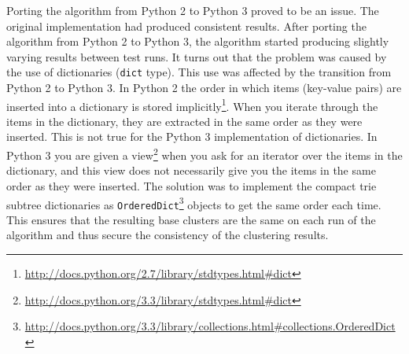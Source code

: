 

Porting the \CTC algorithm from Python 2 to Python 3 proved to be an issue. The original \CTC implementation had produced consistent results. After porting the algorithm from Python 2 to Python 3, the algorithm started producing slightly varying results between test runs. It turns out that the problem was caused by the use of dictionaries (\texttt{dict} type). This use was affected by the transition from Python 2 to Python 3. In Python 2 the order in which items (key-value pairs) are inserted into a dictionary is stored implicitly\footnote{\url{http://docs.python.org/2.7/library/stdtypes.html\#dict}}. When you iterate through the items in the dictionary, they are extracted in the same order as they were inserted. This is not true for the Python 3 implementation of dictionaries. In Python 3 you are given a view\footnote{\url{http://docs.python.org/3.3/library/stdtypes.html\#dict}} when you ask for an iterator over the items in the dictionary, and this view does not necessarily give you the items in the same order as they were inserted. The solution was to implement the compact trie subtree dictionaries as \texttt{OrderedDict}\footnote{\url{http://docs.python.org/3.3/library/collections.html\#collections.OrderedDict}} objects to get the same order each time. This ensures that the resulting base clusters are the same on each run of the algorithm and thus secure the consistency of the clustering results.

